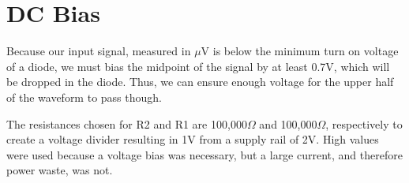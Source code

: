 \section{DC Bias}

Because our input signal, measured in $\mu$V is below the minimum turn on voltage of a diode, we must bias the midpoint of the signal by at least 0.7V, which will be dropped in the diode. Thus, we can ensure enough voltage for the upper half of the waveform to pass though. 

The resistances chosen for R2 and R1 are 100,000$\Omega$ and 100,000$\Omega$, respectively to create a voltage divider resulting in 1V from a supply rail of 2V. High values were used because a voltage bias was necessary, but a large current, and therefore power waste, was not.